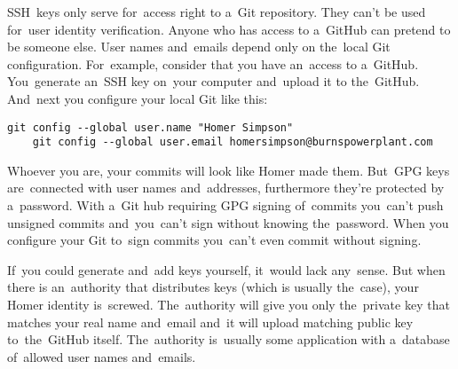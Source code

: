 SSH~keys only serve for~access right to a~Git repository. They can't be used for~user identity verification. Anyone who has access to a~GitHub can pretend to be someone else. User names and~emails depend only on the~local Git configuration. For~example, consider that you have an~access to a~GitHub. You~generate an~SSH key on~your computer and~upload it to the~GitHub. And~next you configure your local Git like this:
\begin{lstlisting}[frame=no]
    git config --global user.name "Homer Simpson"
    git config --global user.email homersimpson@burnspowerplant.com
\end{lstlisting}
\noindent Whoever you are, your commits will look like Homer made them. But~GPG keys are~connected with user names and~addresses, furthermore they're protected by a~password. With a~Git hub requiring GPG signing of~commits you~can't push unsigned commits and~you~can't sign without knowing the~password. When you configure your Git to~sign commits you~can't even commit without signing.

If~you could generate and~add keys yourself, it~would lack any~sense. But when there is an~authority that distributes keys (which is usually the~case), your Homer identity is~screwed. The~authority will give you only the~private key that matches your real name and~email and~it will upload matching public key to~the~GitHub itself. The~authority is~usually some application with a~database of~allowed user names and~emails.